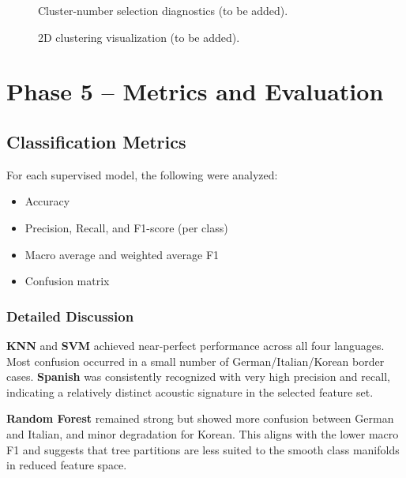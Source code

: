 \documentclass[a4paper,14pt]{extarticle}
\begin{document}
\begin{figure}[h]
    \centering
    \caption{Cluster-number selection diagnostics (to be added).}
    \label{fig:k_selection_placeholder}
\end{figure}

\begin{figure}[h]
    \centering
    \caption{2D clustering visualization (to be added).}
    \label{fig:cluster_visualization_placeholder}
\end{figure}

\newpage
\section{Phase 5 -- Metrics and Evaluation}

\subsection{Classification Metrics}
For each supervised model, the following were analyzed:
\begin{itemize}
    \item Accuracy
    \item Precision, Recall, and F1-score (per class)
    \item Macro average and weighted average F1
    \item Confusion matrix
\end{itemize}

\subsubsection{Detailed Discussion}
\textbf{KNN} and \textbf{SVM} achieved near-perfect performance across all four languages. Most confusion occurred in a small number of German/Italian/Korean border cases. \textbf{Spanish} was consistently recognized with very high precision and recall, indicating a relatively distinct acoustic signature in the selected feature set.

\textbf{Random Forest} remained strong but showed more confusion between German and Italian, and minor degradation for Korean. This aligns with the lower macro F1 and suggests that tree partitions are less suited to the smooth class manifolds in reduced feature space.
\end{document}
